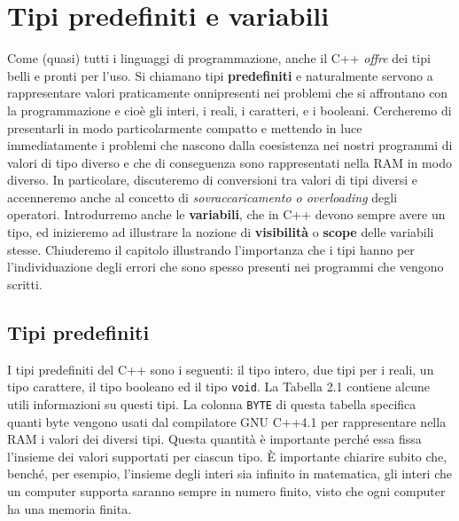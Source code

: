 \chapter{Tipi predefiniti e variabili}
\noindent Come (quasi) tutti i linguaggi di programmazione, anche il C++ \textit{offre} dei tipi belli e pronti per l'uso.
Si chiamano tipi \textbf{predefiniti} e naturalmente servono a rappresentare valori praticamente onnipresenti nei problemi che si affrontano con la programmazione e cioè gli interi, i reali, i caratteri, e i booleani.
Cercheremo di presentarli in modo particolarmente compatto e mettendo in luce immediatamente i problemi che nascono dalla coesistenza nei nostri programmi di valori di tipo diverso e che di conseguenza sono rappresentati nella RAM in modo diverso.
In particolare, discuteremo di conversioni tra valori di tipi diversi e accenneremo anche al concetto di \textit{sovraccaricamento o overloading} degli operatori.
Introdurremo anche le \textbf{variabili}, che in C++ devono sempre avere un tipo, ed inizieremo ad illustrare la nozione di \textbf{visibilità} o \textbf{scope} delle variabili stesse.
Chiuderemo il capitolo illustrando l'importanza che i tipi hanno per l'individuazione degli errori che sono spesso presenti nei programmi che vengono scritti. 

\section{Tipi predefiniti}
\noindent I tipi predefiniti del C++ sono i seguenti: il tipo intero, due tipi per i reali, un tipo carattere, il tipo booleano ed il tipo \texttt{void}.
La Tabella 2.1 contiene alcune utili informazioni su questi tipi.
La colonna \texttt{BYTE} di questa tabella specifica quanti byte vengono usati dal compilatore GNU C++4.1 per rappresentare nella RAM i valori dei diversi tipi.
Questa quantità è importante perché essa fissa l'insieme dei valori supportati per ciascun tipo.
È importante chiarire subito che, benché, per esempio, l'insieme degli interi sia infinito in matematica, gli interi che un computer supporta saranno sempre in numero finito, visto che ogni computer ha una memoria finita.

